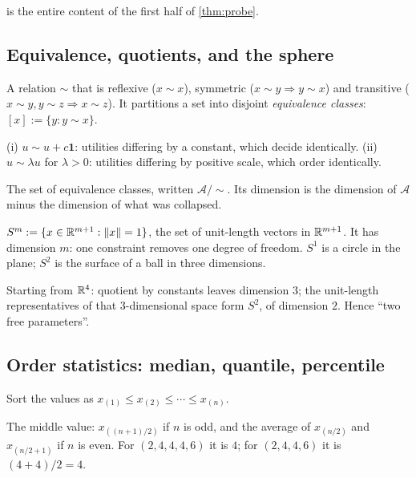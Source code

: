  is the entire content of the first half of \cref{thm:probe}.

\subsection{Equivalence, quotients, and the sphere}

\begin{definition}
A relation $\sim$ that is reflexive ($x\sim x$), symmetric ($x\sim y \Rightarrow
y \sim x$) and transitive ($x\sim y, y\sim z \Rightarrow x\sim z$). It partitions
a set into disjoint \emph{equivalence classes}: $[x] := \{y : y\sim x\}$.
\end{definition}

 (i) $u \sim u+c\mathbf{1}$: utilities differing by a
constant, which decide identically. (ii) $u \sim \lambda u$ for $\lambda>0$:
utilities differing by positive scale, which order identically.

\begin{definition}[Quotient]
The set of equivalence classes, written $\mathcal{A}/\!\sim$. Its dimension is
the dimension of $\mathcal{A}$ minus the dimension of what was collapsed.
\end{definition}

\begin{definition}[Sphere]
$S^{m} := \{x \in \mathbb{R}^{m+1} : \|x\|=1\}$, the set of unit-length vectors in
$\mathbb{R}^{m+1}$. It has dimension $m$: one constraint removes one degree of freedom.
$S^1$ is a circle in the plane; $S^2$ is the surface of a ball in three
dimensions.
\end{definition}

 Starting from
$\mathbb{R}^4$: quotient by constants leaves dimension $3$; the unit-length
representatives of that $3$-dimensional space form $S^2$, of dimension $2$. Hence
``two free parameters''.

\subsection{Order statistics: median, quantile, percentile}

Sort the values as $x_{(1)}\le x_{(2)}\le\cdots\le x_{(n)}$.

\begin{definition}[Median]
The middle value: $x_{((n+1)/2)}$ if $n$ is odd, and the average of
$x_{(n/2)}$ and $x_{(n/2+1)}$ if $n$ is even. For $(2,4,4,4,6)$ it is $4$; for
$(2,4,4,6)$ it is $(4+4)/2=4$.
\end{definition}

